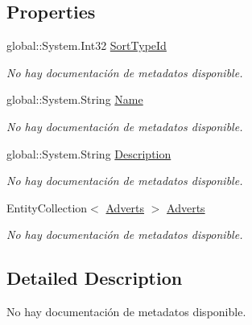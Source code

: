 \subsection*{Properties}
\begin{DoxyCompactItemize}
\item 
global\-::\-System.\-Int32 \hyperlink{class_game_memory_1_1_sort_types_a49fac50b119c2c0286cfdbd9769dea4a}{Sort\-Type\-Id}
\begin{DoxyCompactList}\small\item\em No hay documentación de metadatos disponible. \end{DoxyCompactList}\item 
global\-::\-System.\-String \hyperlink{class_game_memory_1_1_sort_types_a41a4b183e89b71b60a52e58fba2d3c6f}{Name}
\begin{DoxyCompactList}\small\item\em No hay documentación de metadatos disponible. \end{DoxyCompactList}\item 
global\-::\-System.\-String \hyperlink{class_game_memory_1_1_sort_types_a1b9776a951d3683388021e927ca1a5fb}{Description}
\begin{DoxyCompactList}\small\item\em No hay documentación de metadatos disponible. \end{DoxyCompactList}\item 
Entity\-Collection$<$ \hyperlink{class_game_memory_1_1_adverts}{Adverts} $>$ \hyperlink{class_game_memory_1_1_sort_types_ab9ce3a68aab30a9339f7a9fde700ce25}{Adverts}
\begin{DoxyCompactList}\small\item\em No hay documentación de metadatos disponible. \end{DoxyCompactList}\end{DoxyCompactItemize}


\subsection{Detailed Description}
No hay documentación de metadatos disponible. 



